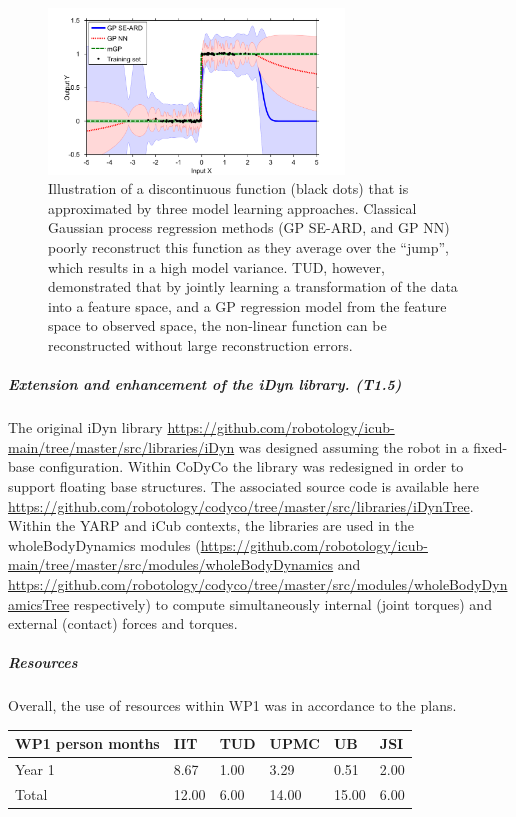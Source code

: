 \documentclass[12pt,a4paper,twoside]{article}
\begin{document}
\begin{figure}
\centering
\includegraphics[width=0.7\textwidth]{./images/AAAI2014_0.pdf}
 \caption{Illustration of a discontinuous function (black dots) that is approximated by three 
 model learning approaches. Classical Gaussian process regression methods (GP SE-ARD, and GP NN) 
 poorly reconstruct this function as they average over the ``jump'', which results in a high model variance. 
 TUD, however, demonstrated that by jointly learning a transformation of the data into a feature space, 
 and a GP regression model from the feature space to observed space, the non-linear function 
 can be reconstructed without large reconstruction errors. 
}
\label{fig:example_discontinuities}
\end{figure}

\subparagraph{Extension and enhancement of the iDyn library. (T1.5)}

The original iDyn library \url{https://github.com/robotology/icub-main/tree/master/src/libraries/iDyn} was designed assuming the robot in a fixed-base configuration. Within CoDyCo the library was redesigned in order to support floating base structures. The associated source code is available here \url{https://github.com/robotology/codyco/tree/master/src/libraries/iDynTree}. Within the YARP and iCub contexts, the libraries are used in the wholeBodyDynamics modules (\url{https://github.com/robotology/icub-main/tree/master/src/modules/wholeBodyDynamics} and \url{https://github.com/robotology/codyco/tree/master/src/modules/wholeBodyDynamicsTree} respectively) to compute simultaneously internal (joint torques) and external (contact) forces and torques. 

\subparagraph{Resources}
Overall, the use of resources within WP1 was in accordance to the plans. 

\begin{center}
\begin{tabular}{|C{1.5cm}|C{1.5cm}|C{1.5cm}|C{2cm}|C{2cm}|C{2cm}|}
\hline
\footnotesize \textbf{WP1 person months}& \footnotesize \textbf{IIT}&\footnotesize \textbf{TUD}&\footnotesize \textbf{UPMC}& \footnotesize \textbf{UB} &\footnotesize \textbf{JSI}\\ \hline
\footnotesize Year 1 &  8.67 &1.00 & 3.29 & 0.51 & 2.00      \\  \hline
\footnotesize Total &  12.00 & 6.00 & 14.00 & 15.00 & 6.00 \\ \hline
\end{tabular}
\end{center}
\end{document}
